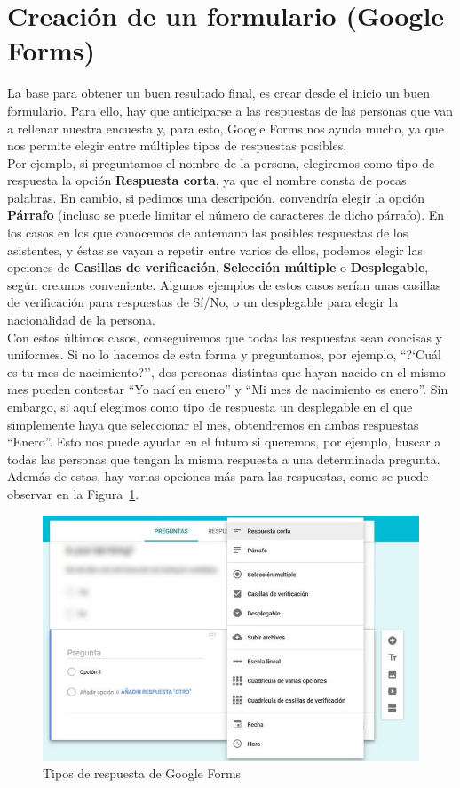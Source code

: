 \documentclass[a4paper, 12pt]{book}
\begin{document}
\section{Creación de un formulario (Google Forms)}
\label{sec:formulario}
La base para obtener un buen resultado final, es crear desde el inicio un buen formulario. Para ello, hay que anticiparse a las respuestas de las personas que van a rellenar nuestra encuesta y, para esto, Google Forms nos ayuda mucho, ya que nos permite elegir entre múltiples tipos de respuestas posibles.\\

Por ejemplo, si preguntamos el nombre de la persona, elegiremos como tipo de respuesta la opción \textbf{Respuesta corta}, ya que el nombre consta de pocas palabras. En cambio, si pedimos una descripción, convendría elegir la opción \textbf{Párrafo} (incluso se puede limitar el número de caracteres de dicho párrafo). En los casos en los que conocemos de antemano las posibles respuestas de los asistentes, y éstas se vayan a repetir entre varios de ellos, podemos elegir las opciones de \textbf{Casillas de verificación}, \textbf{Selección múltiple} o \textbf{Desplegable}, según creamos conveniente. Algunos ejemplos de estos casos serían unas casillas de verificación para respuestas de Sí/No, o un desplegable para elegir la nacionalidad de la persona.\\

Con estos últimos casos, conseguiremos que todas las respuestas sean concisas y uniformes. Si no lo hacemos de esta forma y preguntamos, por ejemplo, ``?`Cuál es tu mes de nacimiento?'', dos personas distintas que hayan nacido en el mismo mes pueden contestar ``Yo nací en enero'' y ``Mi mes de nacimiento es enero''. Sin embargo, si aquí elegimos como tipo de respuesta un desplegable en el que simplemente haya que seleccionar el mes, obtendremos en ambas respuestas ``Enero''. Esto nos puede ayudar en el futuro si queremos, por ejemplo, buscar a todas las personas que tengan la misma respuesta a una determinada pregunta.\\

Además de estas, hay varias opciones más para las respuestas, como se puede observar en la Figura~\ref{fig:form}.
\begin{figure}[h!]
	\centering
	\includegraphics[width=14cm, keepaspectratio]{img/form}
	\caption{Tipos de respuesta de Google Forms}
	\label{fig:form}
\end{figure}
\end{document}

